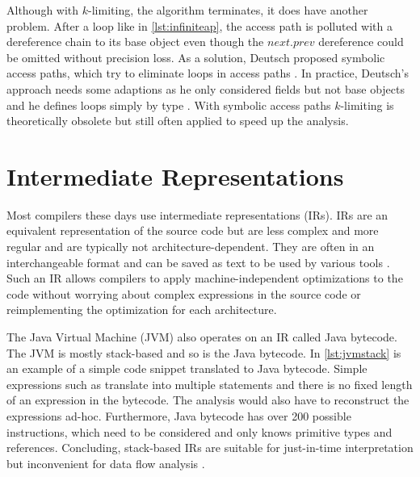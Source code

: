 \documentclass[../draft.tex]{subfiles}
\begin{document}
    Although with $k$-limiting, the algorithm terminates, it does have another problem.
    After a loop like in \autoref{lst:infiniteap}, the access path is polluted with a dereference chain to its base object even though the $next.prev$ dereference could be omitted without precision loss.
    As a solution, Deutsch proposed symbolic access paths, which try to eliminate loops in access paths \cite{Deutsch1994}.
    In practice, Deutsch's approach needs some adaptions as he only considered fields but not base objects and he defines loops simply by type \cite{Arzt2017PhD}.
    With symbolic access paths $k$-limiting is theoretically obsolete but still often applied to speed up the analysis.

    \section{Intermediate Representations}\label{s:jimple}
    Most compilers these days use intermediate representations (IRs).
    IRs are an equivalent representation of the source code but are less complex and more regular and are typically not architecture-dependent.
    They are often in an interchangeable format and can be saved as text to be used by various tools \cite{Thain2019}.
    Such an IR allows compilers to apply machine-independent optimizations to the code without worrying about complex expressions in the source code or reimplementing the optimization for each architecture.

    The Java Virtual Machine (JVM) also operates on an IR called Java bytecode.
    The JVM is mostly stack-based and so is the Java bytecode.
    In \autoref{lst:jvmstack} is an example of a simple code snippet translated to Java bytecode.
    Simple expressions such as  translate into multiple statements and there is no fixed length of an expression in the bytecode.
    The analysis would also have to reconstruct the expressions ad-hoc.
    Furthermore, Java bytecode has over 200 possible instructions\footnotemark{}, which need to be considered and only knows primitive types and references.
    Concluding, stack-based IRs are suitable for just-in-time interpretation but inconvenient for data flow analysis \cite{Valleerai2004}.
\end{document}
